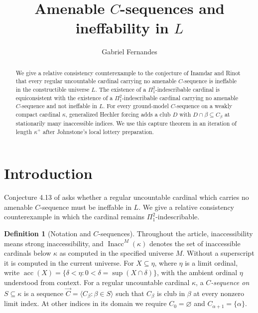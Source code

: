 \documentclass[11pt,a4paper]{amsart}
\title[Amenable $C$-sequences and ineffability in $L$]{Amenable \(C\)-sequences and ineffability in \(L\)}
\author{Gabriel Fernandes}
\date{}
\theoremstyle{definition}
\newtheorem{definition}[theorem]{Definition}
\theoremstyle{remark}
\DeclareMathOperator{\Inacc}{Inacc}
\DeclareMathOperator{\acc}{acc}
\begin{document}
\raggedbottom
\begin{abstract}
We give a relative consistency counterexample to the conjecture
of Inamdar and Rinot that every regular uncountable cardinal carrying no
amenable \(C\)-sequence is ineffable in the constructible
universe \(L\). The existence of a
\(\Pi^2_1\)-indescribable cardinal is equiconsistent with the
existence of a \(\Pi^2_1\)-indescribable cardinal carrying no
amenable \(C\)-sequence and not ineffable in \(L\).
For every ground-model \(C\)-sequence on a weakly compact
cardinal \(\kappa\), generalized Hechler forcing adds a club \(D\)
with \(D\cap\beta\subseteq C_\beta\) at stationarily
many inaccessible indices. We use this capture theorem in
an iteration of length \(\kappa^+\) after Johnstone's local lottery
preparation. 
\end{abstract}
\maketitle

\section{Introduction}\label{sec:introduction}

Conjecture 4.13 of \cite{IR} asks whether a regular uncountable
cardinal which carries no amenable \(C\)-sequence must be
ineffable in \(L\). We give a relative consistency
counterexample in which the cardinal remains
\(\Pi^2_1\)-indescribable. 

\begin{definition}[Notation and \(C\)-sequences]\label{def:c-sequence}
Throughout the article, inaccessibility means strong
inaccessibility, and \(\Inacc^M(\kappa)\) denotes the set of
inaccessible cardinals below \(\kappa\) as computed in the
specified universe \(M\). Without a superscript it is computed
in the current universe. For \(X\subseteq\eta\), where
\(\eta\) is a limit ordinal, write
\(\acc(X)=\{\delta<\eta:0<\delta=\sup(X\cap\delta)\}\),
with the ambient ordinal \(\eta\) understood from context.
For a regular uncountable cardinal \(\kappa\), a
\emph{\(C\)-sequence on \(S\subseteq\kappa\)} is a sequence
\(\vec C=\langle C_\beta:\beta\in S\rangle\) such that
\(C_\beta\) is club in \(\beta\) at every nonzero limit
index. At other indices in its domain we require
\(C_0=\varnothing\) and \(C_{\alpha+1}=\{\alpha\}\).
\end{definition}
\end{document}
